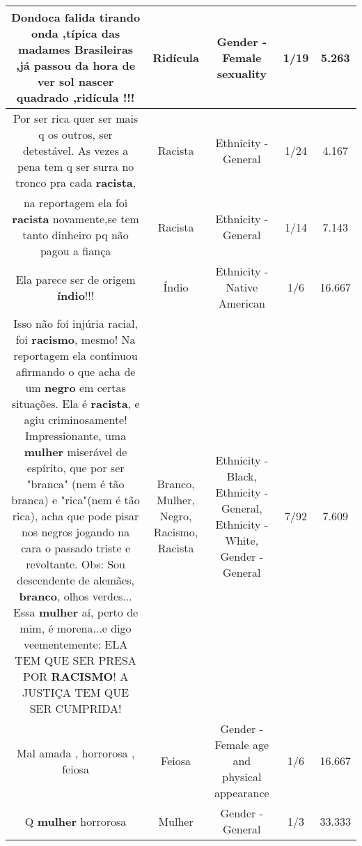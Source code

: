 \documentclass[11pt]{article}
\newlength\mylength
\begin{document}
\begin{center}
\begin{longtable}{|C{.65\mylength}|C{.30\mylength}|C{.12\mylength}|C{.12\mylength}|C{.12\mylength}|}
  \small Dondoca falida tirando onda ,típica das madames Brasileiras ,já passou da hora de ver sol nascer quadrado ,\textbf{ridícula} !!!\normalsize   & Ridícula & Gender - Female sexuality & 1/19 & 5.263 \\  \hline
  \small Por ser rica quer ser mais q os outros, ser detestável. As vezes a pena tem q ser surra no tronco pra cada \textbf{racista},\normalsize   & Racista & Ethnicity - General & 1/24 & 4.167 \\  \hline
  \small na reportagem ela foi \textbf{racista} novamente,se tem tanto dinheiro pq não pagou a fiança\normalsize   & Racista & Ethnicity - General & 1/14 & 7.143 \\  \hline
  \small Ela parece ser de origem \textbf{índio}!!!\normalsize   & Índio & Ethnicity - Native American & 1/6 & 16.667 \\  \hline
  \small Isso não foi injúria racial, foi \textbf{racismo}, mesmo! Na reportagem ela continuou afirmando o que acha de um \textbf{negro} em certas situações. Ela é \textbf{racista}, e agiu criminosamente! Impressionante, uma \textbf{mulher} miserável de espírito, que por ser "branca" (nem é tão branca) e "rica"(nem é tão rica), acha que pode pisar nos negros jogando na cara o passado triste e revoltante. Obs: Sou descendente de alemães, \textbf{branco}, olhos verdes... Essa \textbf{mulher} aí, perto de mim, é morena...e digo veementemente: ELA TEM QUE SER PRESA POR \textbf{RACISMO}! A JUSTIÇA TEM QUE SER CUMPRIDA!\normalsize   & Branco, Mulher, Negro, Racismo, Racista & Ethnicity - Black, Ethnicity - General, Ethnicity - White, Gender - General & 7/92 & 7.609 \\  \hline
  \small Mal amada , horrorosa , feiosa\normalsize   & Feiosa & Gender - Female age and physical appearance & 1/6 & 16.667 \\  \hline
  \small Q \textbf{mulher} horrorosa\normalsize   & Mulher & Gender - General & 1/3 & 33.333 \\  \hline

\end{longtable}
\end{center}
\end{document}
